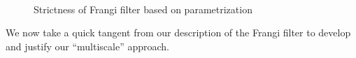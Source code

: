 \begin{figure}[t] \centering
\subfloat[Strict]{\texttt{[image: 4-rs]}} \label{subfig:frangi3d-strict} \\[-.2em]
\subfloat[Standard]{\texttt{[image: 14-rs]}} \label{subfig:frangi3d-default} \\[-.2em]
 \label{subfig:frangi3d-loose} \\[12pt]
\caption{Strictness of Frangi filter based on parametrization}
\label{fig:frangi3d-selection}
\end{figure}

	We now take a quick tangent from our description of the Frangi filter to develop and justify our ``multiscale'' approach.
	
